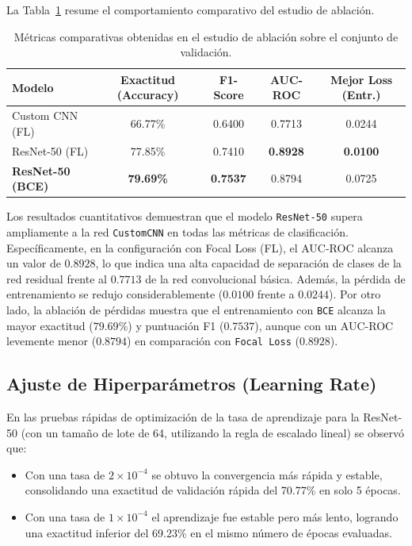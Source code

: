 La Tabla~\ref{tab:resultados} resume el comportamiento comparativo del estudio de ablación.

\begin{table}[htbp]
  \caption{Métricas comparativas obtenidas en el estudio de ablación sobre el conjunto de validación.}
  \label{tab:resultados}
  \centering
  \begin{tabular}{lcccc}
    \toprule
    \textbf{Modelo} & \textbf{Exactitud (Accuracy)} & \textbf{F1-Score} & \textbf{AUC-ROC} & \textbf{Mejor Loss (Entr.)} \\
    \midrule
    Custom CNN (FL) & 66.77\% & 0.6400 & 0.7713 & 0.0244 \\
    ResNet-50 (FL) & 77.85\% & 0.7410 & \textbf{0.8928} & \textbf{0.0100} \\
    \textbf{ResNet-50 (BCE)} & \textbf{79.69\%} & \textbf{0.7537} & 0.8794 & 0.0725 \\
    \bottomrule
  \end{tabular}
\end{table}

Los resultados cuantitativos demuestran que el modelo \texttt{ResNet-50} supera ampliamente a la red \texttt{CustomCNN} en todas las métricas de clasificación. Específicamente, en la configuración con Focal Loss (FL), el AUC-ROC alcanza un valor de $0.8928$, lo que indica una alta capacidad de separación de clases de la red residual frente al $0.7713$ de la red convolucional básica. Además, la pérdida de entrenamiento se redujo considerablemente ($0.0100$ frente a $0.0244$). Por otro lado, la ablación de pérdidas muestra que el entrenamiento con \texttt{BCE} alcanza la mayor exactitud ($79.69\%$) y puntuación F1 ($0.7537$), aunque con un AUC-ROC levemente menor ($0.8794$) en comparación con \texttt{Focal Loss} ($0.8928$).

\subsection{Ajuste de Hiperparámetros (Learning Rate)}
En las pruebas rápidas de optimización de la tasa de aprendizaje para la ResNet-50 (con un tamaño de lote de 64, utilizando la regla de escalado lineal) se observó que:
\begin{itemize}
    \item Con una tasa de $2 \times 10^{-4}$ se obtuvo la convergencia más rápida y estable, consolidando una exactitud de validación rápida del 70.77\% en solo 5 épocas.
    \item Con una tasa de $1 \times 10^{-4}$ el aprendizaje fue estable pero más lento, logrando una exactitud inferior del 69.23\% en el mismo número de épocas evaluadas.
\end{itemize}

